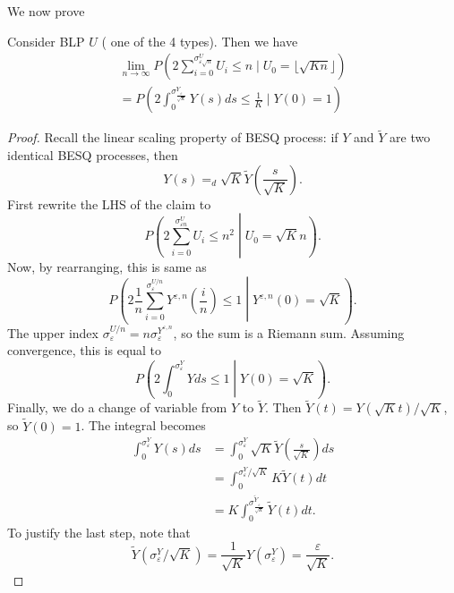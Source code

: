 We now prove
\begin{lemma}
	Consider BLP $U$ ( one of the 4 types). Then we have
	\begin{align*}
\lim _{n \rightarrow \infty} P\left(2 \sum_{i=0}^{\sigma_{\varepsilon \sqrt{n}}^U} U_i \leq n \mid U_0=\lfloor\sqrt{K n}\rfloor\right) \\
=P\left(2 \int_0^{\sigma_{\frac{\varepsilon}{\sqrt{K} }}^Y} Y(s) d s \leq \frac{1}{K} \mid Y(0)=1\right)
\end{align*}
\end{lemma}
\begin{proof}
	Recall the linear scaling property of BESQ process: if $Y$ and  $\tilde Y$ are two identical BESQ processes, then
	\[
		Y(s) =_d \sqrt{K} \tilde Y(\frac{s}{\sqrt{K} })
	.\] 
	First rewrite the LHS of the claim to
	\[
		P\left( 2 \sum_{i = 0}^{\sigma^U _{\varepsilon n}} U_i \le n^2 \middle| U_0 = \sqrt{K} n \right) 
	.\] 
	Now, by rearranging, this is same as
	\[
		P\left( 2 \frac{1}{n} 
		\sum_{i = 0}^{\sigma^{U / n}_\varepsilon} Y^{\varepsilon, n}\left(\frac{i}{n}\right) \le 1  
		\middle|
		Y^{\varepsilon, n}(0) = \sqrt{K} \right) 
	.\] 
	The upper index $\sigma_\varepsilon ^{U / n} = n \sigma _\varepsilon ^{Y^{\varepsilon,n}}$, so the sum is a Riemann sum. Assuming convergence, this is equal to
	\[
		P\left( 2 \int _0^{\sigma_\varepsilon^Y} Y d s \le 1 \middle| Y(0) = \sqrt{K}   \right) 
	.\] 
	Finally, we do a change of variable from $Y$ to $\tilde Y$. Then $\tilde Y (t) = Y(\sqrt{K} t) / \sqrt{K}  $, so $\tilde Y(0) = 1$. The integral becomes
	\begin{align*}
		\int _0^{\sigma^Y_\varepsilon} Y(s) ds
		&= \int _0^{\sigma^Y_\varepsilon} \sqrt{K} \tilde Y \left( \frac{s}{\sqrt{K} } \right)  ds \\
		&= \int _0 ^{\sigma_\varepsilon^Y / \sqrt{K} } K \tilde Y (t) dt \\
		&= K \int _0^{\sigma_{\frac{\varepsilon}{\sqrt{K} }}^{\tilde Y}} \tilde Y(t) dt
	.\end{align*}
	To justify the last step, note that
	\[
		\tilde Y \left( \sigma^Y_{\varepsilon }/\sqrt{K}  \right) = 
		\frac{1}{\sqrt{K} } 
		Y\left( \sigma^Y_\varepsilon \right) 
		= \frac{\varepsilon}{\sqrt{K} }
	.\] 
\end{proof}

